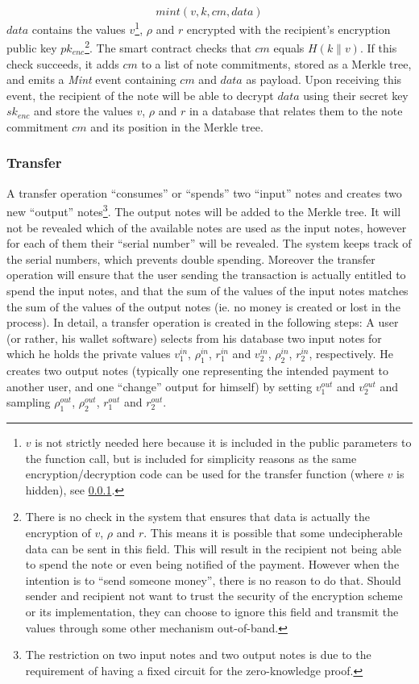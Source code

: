 \documentclass{article}
\newcommand{\conc}{\mathbin{\|}}
\begin{document}
\[ mint(v, k, cm, data) \]
$data$ contains the values $v$\footnote{$v$ is not strictly needed here because it is included in the public parameters to the function call, but is included for simplicity reasons as the same encryption/decryption code can be used for the transfer function (where $v$ is hidden), see \ref{transfer}.}, $\rho$ and $r$ encrypted with the recipient's encryption public key $pk_{enc}$\footnote{There is no check in the system that ensures that data is actually the encryption of $v$, $\rho$ and $r$. This means it is possible that some undecipherable data can be sent in this field. This will result in the recipient not being able to spend the note or even being notified of the payment. However when the intention is to ``send someone money'', there is no reason to do that. Should sender and recipient not want to trust the security of the encryption scheme or its implementation, they can choose to ignore this field and transmit the values through some other mechanism out-of-band.}.
The smart contract checks that $cm$ equals $H(k \conc v)$. If this check succeeds, it adds $cm$ to a list of note commitments, stored as a Merkle tree, and emits a \textit{Mint} event containing $cm$ and $data$ as payload. Upon receiving this event, the recipient of the note will be able to decrypt $data$ using their secret key $sk_{enc}$ and store the values $v$, $\rho$ and $r$ in a database that relates them to the note commitment $cm$ and its position in the Merkle tree.


\subsubsection{Transfer} \label{transfer}
A transfer operation ``consumes'' or ``spends'' two ``input'' notes and creates two new ``output'' notes\footnote{The restriction on two input notes and two output notes is due to the requirement of having a fixed circuit for the zero-knowledge proof.}. The output notes will be added to the Merkle tree. It will not be revealed which of the available notes are used as the input notes, however for each of them their ``serial number'' will be revealed. The system keeps track of the serial numbers, which prevents double spending. Moreover the transfer operation will ensure that the user sending the transaction is actually entitled to spend the input notes, and that the sum of the values of the input notes matches the sum of the values of the output notes (ie. no money is created or lost in the process).
In detail, a transfer operation is created in the following steps: A user (or rather, his wallet software) selects from his database two input notes for which he holds the private values $v_1^{in}$, $\rho_1^{in}$, $r_1^{in}$ and $v_2^{in}$, $\rho_2^{in}$, $r_2^{in}$, respectively. He creates two output notes (typically one representing the intended payment to another user, and one ``change'' output for himself) by setting $v_1^{out}$ and $v_2^{out}$ and sampling  $\rho_1^{out}$, $\rho_2^{out}$, $r_1^{out}$ and $r_2^{out}$.
\end{document}
